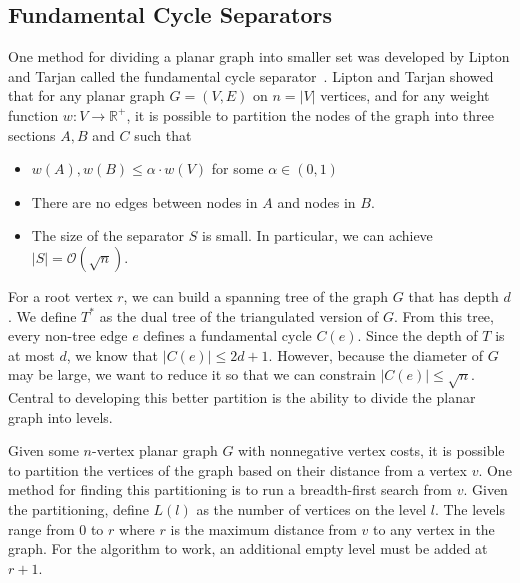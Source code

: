 \documentclass[11pt]{article}
\begin{document}
    \subsection{Fundamental Cycle Separators}
    \label{sec:graph-sep-fund-cycle-sep}

    One method for dividing a planar graph into smaller set was developed by Lipton and Tarjan called the fundamental cycle separator~\cite{lipton1979separator}. Lipton and Tarjan showed that for any planar graph $G = (V,E)$ on $n = |V|$ vertices, and for any weight function $w: V \rightarrow \mathbb{R}^+$, it is possible to partition the nodes of the graph into three sections $A, B$ and $C$ such that
    \begin{itemize}
        \item $w(A), w(B) \leq \alpha \cdot w(V)$ for some $\alpha \in (0,1)$

        \item There are no edges between nodes in $A$ and nodes in $B$.

        \item The size of the separator $S$ is small. In particular, we can achieve $|S| = \mathcal{O}(\sqrt{n})$.
    \end{itemize}

    For a root vertex $r$, we can build a spanning tree of the graph $G$ that has depth $d$. We define $T^*$ as the dual tree of the triangulated version of $G$. From this tree, every non-tree edge $e$ defines a fundamental cycle $C(e)$. Since the depth of $T$ is at most $d$, we know that $|C(e)| \leq 2d + 1$. However, because the diameter of $G$ may be large, we want to reduce it so that we can constrain $|C(e)| \leq \sqrt{n}$. Central to developing this better partition is the ability to divide the planar graph into levels.

Given some $n$-vertex planar graph $G$ with nonnegative vertex costs, it is possible to partition the vertices of the graph based on their distance from a vertex $v$. One method for finding this partitioning is to run a breadth-first search from $v$. Given the partitioning, define $L(l)$ as the number of vertices on the level $l$. The levels range from $0$ to $r$ where $r$ is the maximum distance from $v$ to any vertex in the graph. For the algorithm to work, an additional empty level must be added at $r+1$.
\end{document}
